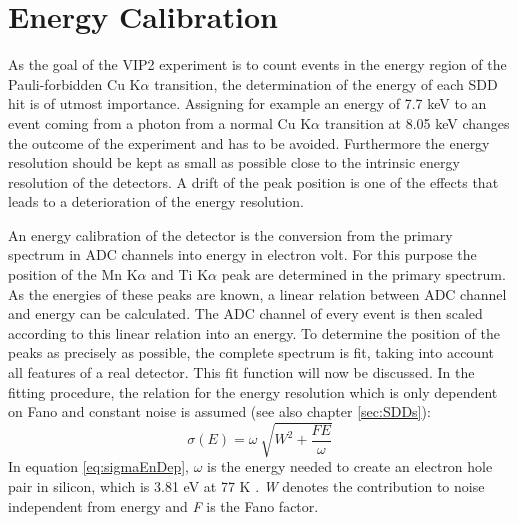 \section{Energy Calibration}
\label{sec:eneCal}

As the goal of the VIP2 experiment is to count events in the energy region of the Pauli-forbidden Cu K$\alpha$ transition, the determination of the energy of each SDD hit is of utmost importance. Assigning for example an energy of 7.7 keV to an event coming from a photon from a normal Cu K$\alpha$ transition at 8.05 keV changes the outcome of the experiment and has to be avoided. Furthermore the energy resolution should be kept as small as possible close to the intrinsic energy resolution of the detectors. A drift of the peak position is one of the effects that leads to a deterioration of the energy resolution. 

An energy calibration of the detector is the conversion from the primary spectrum in ADC channels into energy in electron volt. For this purpose the position of the Mn K$\alpha$ and Ti K$\alpha$ peak are determined in the primary spectrum. As the energies of these peaks are known, a linear relation between ADC channel and energy can be calculated. The ADC channel of every event is then scaled according to this linear relation into an energy. To determine the position of the peaks as precisely as possible, the complete spectrum is fit, taking into account all features of a real detector. This fit function will now be discussed. In the fitting procedure, the relation for the energy resolution which is only dependent on Fano and constant noise is assumed (see also chapter \ref{sec:SDDs}):
\begin{equation}
 \sigma(E) = \omega \ \sqrt{W^{2} + \frac{FE}{\omega}}
 \label{eq:sigmaEnDep}
\end{equation} 
In equation \ref{eq:sigmaEnDep}, $\omega$ is the energy needed to create an electron hole pair in silicon, which is 3.81 eV at 77 K \cite{Leo1993}. \textit{W} denotes the contribution to noise independent from energy and \textit{F} is the Fano factor. 

